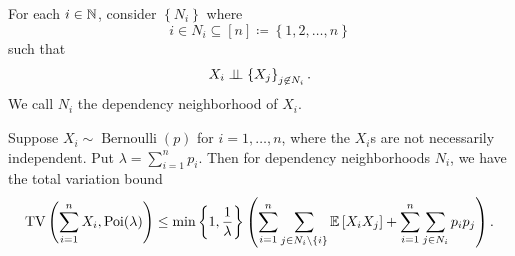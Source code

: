 \begin{definition}
	For each $i \in \mathbb{N}$, consider $\left\{N_i\right\}$ where \[
		i \in N_i \subseteq [n] \coloneqq \left\{1,2,\ldots,n\right\}
	\] such that \[
		X_i \perp\!\!\!\perp \left\{X_j\right\}_{j \not\in N_i}
	.\] We call $N_i$ the dependency neighborhood of $X_i$.
\end{definition}

\begin{theorem} \label{3-3-1}
	Suppose $X_i \sim \operatorname{Bernoulli}(p)$ for $i=1,\ldots,n$, where the $X_i$s are not necessarily independent. Put $\lambda = \sum_{i=1}^{n} p_i$. Then for dependency neighborhoods $N_i$, we have the total variation bound \[
		\operatorname{TV}\left( \sum\limits_{i=1}^{n} X_i, \operatorname{Poi}(\lambda) \right)
		\le \min\left\{1,\frac{1}{\lambda}\right\} \left( \sum\limits_{i=1}^{n} \sum\limits_{j \in N_i \setminus \left\{i\right\}}^{} \mathbb{E}\left[X_i X_j\right] + \sum\limits_{i=1}^{n} \sum_{j \in N_i}p_ip_j \right)
	.\] 
\end{theorem}
